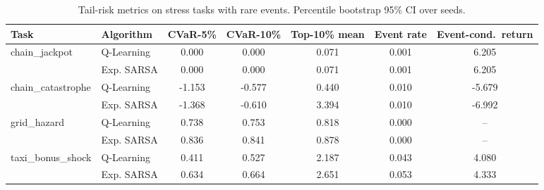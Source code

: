 \begin{table}[t]
\centering
\caption{Tail-risk metrics on stress tasks with rare events.  Percentile bootstrap 95\% CI over seeds.}
\label{tab:p2d}
\begin{tabular}{llccccc}
\toprule
Task & Algorithm & CVaR-5\% & CVaR-10\% & Top-10\% mean & Event rate & Event-cond.\ return \\
\midrule
  chain\_jackpot & Q-Learning & 0.000 & 0.000 & 0.071 & 0.001 & 6.205 \\
   & Exp. SARSA & 0.000 & 0.000 & 0.071 & 0.001 & 6.205 \\
\midrule
  chain\_catastrophe & Q-Learning & -1.153 & -0.577 & 0.440 & 0.010 & -5.679 \\
   & Exp. SARSA & -1.368 & -0.610 & 3.394 & 0.010 & -6.992 \\
\midrule
  grid\_hazard & Q-Learning & 0.738 & 0.753 & 0.818 & 0.000 & -- \\
   & Exp. SARSA & 0.836 & 0.841 & 0.878 & 0.000 & -- \\
\midrule
  taxi\_bonus\_shock & Q-Learning & 0.411 & 0.527 & 2.187 & 0.043 & 4.080 \\
   & Exp. SARSA & 0.634 & 0.664 & 2.651 & 0.053 & 4.333 \\
\bottomrule
\end{tabular}
\end{table}
